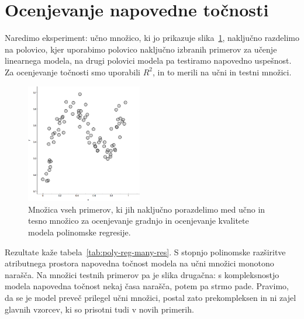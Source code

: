 \section{Ocenjevanje napovedne točnosti}

Naredimo eksperiment: učno množico, ki jo prikazuje slika~\ref{fig:poly-reg-many}, naključno razdelimo na polovico, kjer uporabimo polovico naključno izbranih primerov za učenje linearnega modela, na drugi polovici modela pa testiramo napovedno uspešnost. Za ocenjevanje točnosti smo uporabili $R^2$, in to merili na učni in testni množici.

\begin{figure}[htbp]
\begin{center}
  \includegraphics[width=0.45\textwidth]{slike/poly-reg-many.png}
\caption{Množica vseh primerov, ki jih naključno porazdelimo med učno in tesno množico za ocenjevanje gradnjo in ocenjevanje kvalitete modela polinomske regresije.}
\label{fig:poly-reg-many}
\end{center}
\end{figure}

Rezultate kaže tabela~\ref{tab:poly-reg-many-res}. S stopnjo polinomske razširitve atributnega prostora napovedna točnost modela na učni množici monotono narašča. Na množici testnih primerov pa je slika drugačna: s kompleksnostjo modela napovedna točnost nekaj časa narašča, potem pa strmo pade. Pravimo, da se je model preveč prilegel učni množici, postal zato prekompleksen in ni zajel glavnih vzorcev, ki so prisotni tudi v novih primerih.

